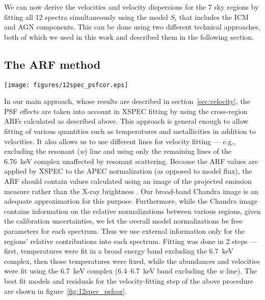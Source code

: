 We can now derive the velocities and velocity dispersions for the 7 sky regions by fitting all 12 spectra simultaneously using the model $S_i$ that includes the ICM and AGN components. This can be done using two different technical approaches, both of which we used in this work and described them in the following section.

\subsection{The ARF method}
\label{sec:arfs}

\begin{figure*}
 \begin{center}
  \texttt{[image: figures/12spec\_psfcor.eps]}
 \end{center}
 \caption{Fits and residuals for the PSF-corrected velocity mapping.}
 \label{fig:12spec_psfcor}
\end{figure*}

In our main approach, whose results are described in section~\ref{sec:velocity}, the PSF effects are taken into account in {\small XSPEC} fitting by using the cross-region ARFs calculated as described above. This approach is general enough to allow fitting of various quantities such as temperatures and metallicities in addition to velocities. It also allows us to use different lines for velocity fitting --- e.g., excluding the resonant ({\it w}) line and using only the remaining lines of the 6.76~keV complex unaffected by resonant scattering. Because the ARF values are applied by {\small XSPEC} to the APEC normalization (as opposed to model flux), the ARF should contain values calculated using an image of the projected emission measure rather than the X-ray brightness \citep{markevitch96b}. Our broad-band Chandra image is an adequate approximation for this purpose. Furthermore, while the Chandra image contains information on the relative normalizations between various regions, given the calibration uncertainties, we let the overall model normalizations be free parameters for each spectrum. Thus we use external information only for the regions' relative contributions into each spectrum. Fitting was done in 2 steps --- first, temperatures were fit in a broad energy band excluding the 6.7~keV complex, then those temperatures were fixed, while the abundances and velocities were fit using the 6.7~keV complex (6.4--6.7~keV band excluding the {\it w} line). The best fit models and residuals for the velocity-fitting step of the above procedure are shown in figure~\ref{fig:12spec_psfcor}.

